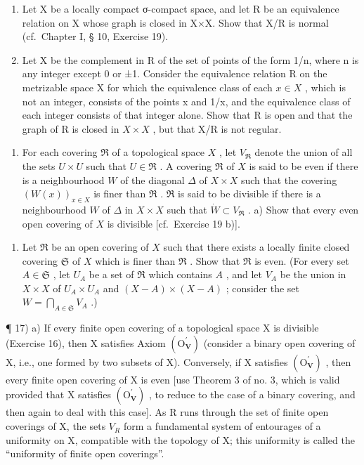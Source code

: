 \begin{enumerate}
\def\labelenumi{\alph{enumi})}
\setcounter{enumi}{1}
\item
  Let X be a locally compact σ-compact space, and let R be an equivalence relation on X whose graph is closed in X×X. Show that X/R is normal (cf.~Chapter I, § 10, Exercise 19).
\item
  Let X be the complement in R of the set of points of the form 1/n, where n is any integer except 0 or ±1. Consider the equivalence relation R on the metrizable space X for which the equivalence class of each \(x \in X\) , which is not an integer, consists of the points x and 1/x, and the equivalence class of each integer consists of that integer alone. Show that R is open and that the graph of R is closed in \(X \times X\) , but that X/R is not regular.
\end{enumerate}

\begin{enumerate}
\def\labelenumi{\arabic{enumi})}
\setcounter{enumi}{15}
\tightlist
\item
  For each covering \(\Re\) of a topological space \(X\) , let \(V_{\Re}\) denote the union of all the sets \(U \times U\) such that \(U \in \Re\) . A covering \(\Re\) of \(X\) is said to be even if there is a neighbourhood \(W\) of the diagonal \(\Delta\) of \(X \times X\) such that the covering \((W(x))_{x \in X}\) is finer than \(\Re\) . \(\Re\) is said to be divisible if there is a neighbourhood \(W\) of \(\Delta\) in \(X \times X\) such that \(\dot{W} \subset V_{\Re}\) . a) Show that every even open covering of \(X\) is divisible {[}cf.~Exercise 19 b){]}.
\end{enumerate}

\begin{enumerate}
\def\labelenumi{\alph{enumi})}
\setcounter{enumi}{1}
\tightlist
\item
  Let \(\Re\) be an open covering of \(X\) such that there exists a locally finite closed covering \(\mathfrak{S}\) of \(X\) which is finer than \(\Re\) . Show that \(\Re\) is even. (For every set \(A \in \mathfrak{S}\) , let \(U_A\) be a set of \(\Re\) which contains \(A\) , and let \(V_A\) be the union in \(X \times X\) of \(U_A \times U_A\) and \((X - A) \times (X - A)\) ; consider the set \(W = \bigcap_{A \in \mathfrak{S}} V_A\) .)
\end{enumerate}

¶ 17) a) If every finite open covering of a topological space X is divisible (Exercise 16), then X satisfies Axiom \((\mathrm{O}_{\mathbf{V}}^{\prime})\) (consider a binary open covering of X, i.e., one formed by two subsets of X). Conversely, if X satisfies \((\mathrm{O}_{\mathbf{V}}^{\prime})\) , then every finite open covering of X is even {[}use Theorem 3 of no. 3, which is valid provided that X satisfies \((\mathrm{O}_{\mathbf{V}}^{\prime})\) , to reduce to the case of a binary covering, and then again to deal with this case{]}. As R runs through the set of finite open coverings of X, the sets \(V_{R}\) form a fundamental system of entourages of a uniformity on X, compatible with the topology of X; this uniformity is called the ``uniformity of finite open coverings''.

